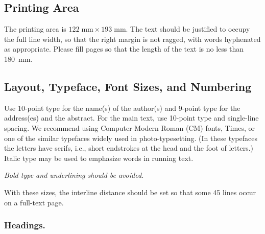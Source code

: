 \documentclass[runningheads]{llncs}
\begin{document}
\subsection{Printing Area}

The printing area is $122  \; \mbox{mm} \times 193 \;
\mbox{mm}$.
The text should be justified to occupy the full line width,
so that the right margin is not ragged, with words hyphenated as
appropriate. Please fill pages so that the length of the text
is no less than 180~mm.

\subsection{Layout, Typeface, Font Sizes, and Numbering}

Use 10-point type for the name(s) of the author(s) and 9-point type for
the address(es) and the abstract. For the main text, use 10-point
type and single-line spacing.
We recommend using Computer Modern Roman (CM) fonts, Times, or one
of the similar typefaces widely used in photo-typesetting.
(In these typefaces the letters have serifs, i.e., short endstrokes at
the head and the foot of letters.)
Italic type may be used to emphasize words in running text.

{\it Bold
type and underlining should be avoided.}

With these sizes, the interline distance should be set so that some 45
lines occur on a full-text page.

\subsubsection{Headings.}
\end{document}
